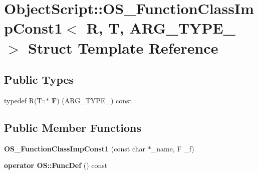 \hypertarget{struct_object_script_1_1_o_s___function_class_imp_const1}{}\section{Object\+Script\+:\+:O\+S\+\_\+\+Function\+Class\+Imp\+Const1$<$ R, T, A\+R\+G\+\_\+\+T\+Y\+P\+E\+\_ $>$ Struct Template Reference}
\label{struct_object_script_1_1_o_s___function_class_imp_const1}
\subsection*{Public Types}
\begin{DoxyCompactItemize}
\item 
typedef R(T\+::$\ast$ {\bfseries F}) (A\+R\+G\+\_\+\+T\+Y\+P\+E\+\_) const \hypertarget{struct_object_script_1_1_o_s___function_class_imp_const1_a84863a8b833bc779ea401343fca1525e}{}\label{struct_object_script_1_1_o_s___function_class_imp_const1_a84863a8b833bc779ea401343fca1525e}

\end{DoxyCompactItemize}
\subsection*{Public Member Functions}
\begin{DoxyCompactItemize}
\item 
{\bfseries O\+S\+\_\+\+Function\+Class\+Imp\+Const1} (const char $\ast$\+\_\+name, F \+\_\+f)\hypertarget{struct_object_script_1_1_o_s___function_class_imp_const1_a1bae071ed99afedd46e581c22ce84332}{}\label{struct_object_script_1_1_o_s___function_class_imp_const1_a1bae071ed99afedd46e581c22ce84332}

\item 
{\bfseries operator O\+S\+::\+Func\+Def} () const \hypertarget{struct_object_script_1_1_o_s___function_class_imp_const1_a3c6e45e6aef73201adcbfbd2c384f5c3}{}\label{struct_object_script_1_1_o_s___function_class_imp_const1_a3c6e45e6aef73201adcbfbd2c384f5c3}

\end{DoxyCompactItemize}
